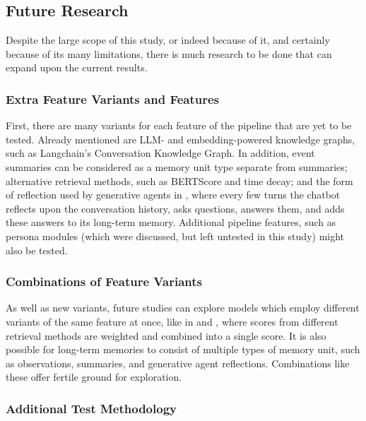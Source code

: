 
\subsection{Future Research}

Despite the large scope of this study, or indeed because of it, and certainly because of its many limitations, there is much research to be done that can expand upon the current results.


\subsubsection{Extra Feature Variants and Features}

First, there are many variants for each feature of the pipeline that are yet to be tested. Already mentioned are LLM- and embedding-powered knowledge graphs, such as Langchain's Conversation Knowledge Graph. In addition, event summaries can be considered as a memory unit type separate from summaries; alternative retrieval methods, such as BERTScore and time decay; and the form of reflection used by generative agents in \cite{Park2023}, where every few turns the chatbot reflects upon the conversation history, asks questions, answers them, and adds these answers to its long-term memory. Additional pipeline features, such as persona modules (which were discussed, but left untested in this study) might also be tested.
	
	
\subsubsection{Combinations of Feature Variants}

As well as new variants, future studies can explore models which employ different variants of the same feature at once, like in \cite{Park2023} and \cite{Zhong2023}, where scores from different retrieval methods are weighted and combined into a single score. It is also possible for long-term memories to consist of multiple types of memory unit, such as observations, summaries, and generative agent reflections. Combinations like these offer fertile ground for exploration.	
			

\subsubsection{Additional Test Methodology}

